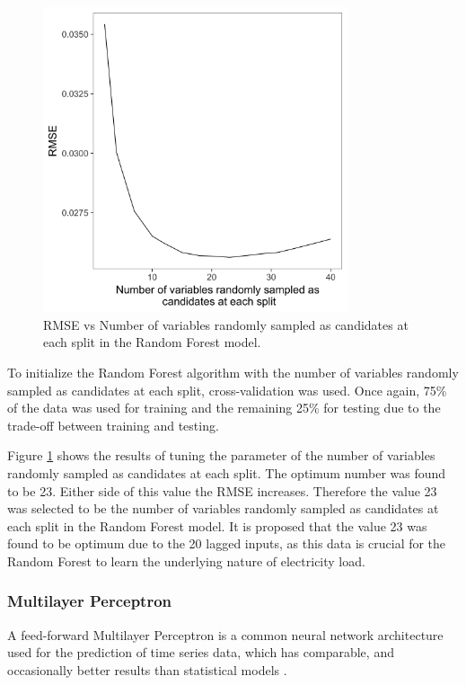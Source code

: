 \begin{figure}[b]
	\includegraphics[width=0.8\textwidth]{Chapter5/figures/rforest_parameter_tuning}
	\caption{RMSE vs Number of variables randomly sampled as candidates at each split in the Random Forest model.}
	\label{fig:rf_param_tune}
\end{figure}

To initialize the Random Forest algorithm with the number of variables randomly sampled as candidates at each split, cross-validation was used. Once again, 75\% of the data was used for training and the remaining 25\% for testing due to the trade-off between training and testing.

Figure \ref{fig:rf_param_tune} shows the results of tuning the parameter of the number of variables randomly sampled as candidates at each split. The optimum number was found to be 23. Either side of this value the RMSE increases. Therefore the value 23 was selected to be the number of variables randomly sampled as candidates at each split in the Random Forest model. It is proposed that the value 23 was found to be optimum due to the 20 lagged inputs, as this data is crucial for the Random Forest to learn the underlying nature of electricity load.


\subsubsection{Multilayer Perceptron}

A feed-forward Multilayer Perceptron is a common neural network architecture used for the prediction of time series data, which has comparable, and occasionally better results than statistical models \cite{Hill1994}. 

